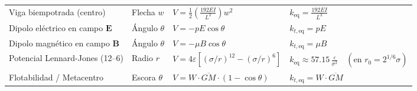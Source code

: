 \documentclass[10pt,a4paper]{article}
\begin{document}
\begin{center}
\begin{tabular*}{\linewidth}{@{\extracolsep{\fill}}llll@{}}
Viga biempotrada (centro) & Flecha $w$ & $V = \frac{1}{2}\left(\frac{192EI}{L^3}\right)w^2$ & $k_{\text{eq}} = \frac{192EI}{L^3}$ \\
Dipolo eléctrico en campo $\mathbf{E}$ & Ángulo $\theta$ & $V = -pE\cos\theta$ & $k_{t,\text{eq}} = pE$ \\
Dipolo magnético en campo $\mathbf{B}$ & Ángulo $\theta$ & $V = -\mu B\cos\theta$ & $k_{t,\text{eq}} = \mu B$ \\
Potencial Lennard-Jones (12--6) & Radio $r$ & $V = 4\varepsilon [(\sigma/r)^{12} - (\sigma/r)^6]$ & $k_{\text{eq}} \approx 57.15\,\frac{\varepsilon}{\sigma^2} \quad (\text{en } r_0 = 2^{1/6}\sigma)$ \\
Flotabilidad / Metacentro & Escora $\theta$ & $V = W\cdot\overline{GM}\cdot(1-\cos\theta)$ & $k_{t,\text{eq}} = W\cdot\overline{GM}$ \\
\bottomrule
\end{tabular*}
\end{center}
\end{document}
